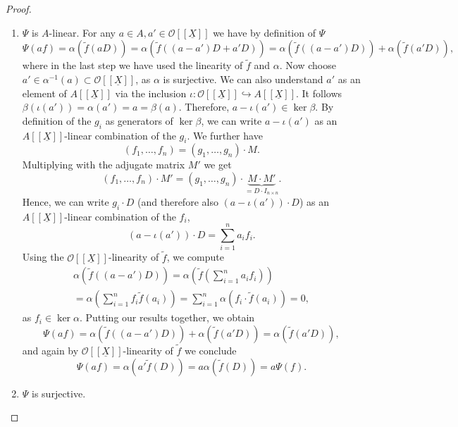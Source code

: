 \documentclass{article}
\theoremstyle{plain}%
\theoremstyle{definition}
\theoremstyle{remark}
\begin{document}
\begin{proof}
    \begin{enumerate}
        \item \(\Psi\) is \(A\)-linear.
        For any \(a \in A, a' \in \mathcal{O}[[\underline{X}]]\) we have by definition of \(\Psi\)
        \[
            \Psi(af) = \alpha(\tilde f(aD)) = \alpha(\tilde f((a - a')D + a'D))
            = \alpha(\tilde f((a-a')D)) + \alpha(\tilde f(a'D)),
        \]
        where in the last step we have used the linearity of \(\tilde f\) and \(\alpha\).
        Now choose \(a' \in \alpha^{-1}(a) \subset \mathcal{O}[[\underline{X}]]\), as \(\alpha\) is surjective.
        We can also understand \(a'\) as an element of \(A[[\underline{X}]]\) via the inclusion
        \(\iota\colon\mathcal{O}[[\underline{X}]] \hookrightarrow A[[\underline{X}]]\).
        It follows \(\beta(\iota(a')) = \alpha(a') = a = \beta(a)\). Therefore, \(a - \iota(a') \in \ker \beta\).
        By definition of the \(g_i\) as generators of \(\ker \beta\), we can write \(a - \iota(a')\) as an 
        \(A[[\underline{X}]]\)-linear combination of the \(g_i\).
        We further have
        \[
            (f_1, \dots, f_n) = (g_1, \dots, g_n) \cdot M.
        \]
        Multiplying with the adjugate matrix \(M'\) we get
        \[  
            (f_1, \dots, f_n) \cdot M' = (g_1, \dots, g_n) \cdot \underbrace{M \cdot M'}_{= D \cdot I_{n\times n}}.
        \]
        Hence, we can write \(g_i \cdot D\) (and therefore also \((a - \iota(a'))\cdot D\)) 
        as an \(A[[\underline{X}]]\)-linear combination of the \(f_i\),
        \[
            (a - \iota(a'))\cdot D = \sum_{i=1}^n a_i f_i.
        \]
        Using the \(\mathcal{O}[[\underline{X}]]\)-linearity of \(\tilde f\), we compute
        \begin{multline*}
            \alpha(\tilde f((a-a')D)) = \alpha\left(\tilde{f}\left(\sum_{i=1}^n a_i f_i\right)\right)\\
            = \alpha\left(\sum_{i=1}^n f_i \tilde{f}(a_i)\right) = \sum_{i=1}^n \alpha(f_i \cdot \tilde{f}(a_i)) = 0,
        \end{multline*}
        as \(f_i \in \ker \alpha\).
        Putting our results together, we obtain
        \[
            \Psi(af) = \alpha(\tilde f((a-a')D)) + \alpha(\tilde f(a'D)) = \alpha(\tilde f(a'D)),
        \]
        and again by \(\mathcal{O}[[\underline{X}]]\)-linearity of \(\tilde f\) we conclude
        \[
            \Psi(af) = \alpha(a'\tilde f(D)) = a \alpha(\tilde f(D)) = a \Psi(f).
        \]
        \item \(\Psi\) is surjective.

\end{enumerate}
\end{proof}
\end{document}
